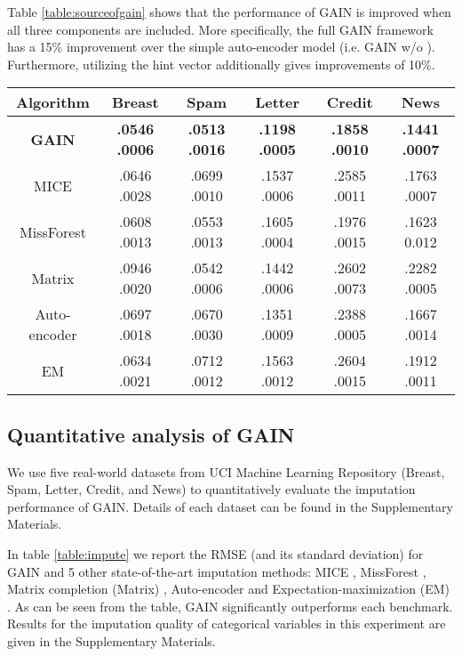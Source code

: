 \documentclass{article}
\begin{document}
Table \ref{table:sourceofgain} shows that the performance of GAIN is improved when all three components are included. More specifically, the full GAIN framework has a 15\% improvement over the simple auto-encoder model (i.e. GAIN w/o ). Furthermore, utilizing the hint vector additionally gives improvements of 10\%.


    \begin{table*}[t!]
        \renewcommand{\arraystretch}{1.3}
        \caption{Imputation performance in terms of RMSE (Average  Std of RMSE)}    
        \label{table:impute}
        \centering
        \begin{tabular}{ |c|| c | c  |  c| c | c |   }
            \toprule
            \textbf{Algorithm}    & \textbf{Breast} &  \textbf{Spam} & \textbf{Letter}& \textbf{Credit} & \textbf{News}   \\ \midrule
            \textbf{GAIN} & \textbf{.0546  .0006} & \textbf{.0513 .0016} & \textbf{.1198 .0005}  & \textbf{.1858  .0010} & \textbf{.1441  .0007}  \\  \midrule
            MICE  & .0646  .0028 & .0699  .0010 & .1537  .0006  & .2585  .0011 & .1763  .0007  \\ 
            MissForest  & .0608  .0013 & .0553  .0013 & .1605  .0004  & .1976  .0015 & .1623  0.012
             \\ 
            Matrix  & .0946  .0020 & .0542  .0006 & .1442  .0006  & .2602  .0073 & .2282  .0005 \\
            Auto-encoder  & .0697  .0018 & .0670  .0030 & .1351  .0009  & .2388  .0005 & .1667  .0014   \\
            EM & .0634  .0021 & .0712  .0012 & .1563  .0012  & .2604  .0015 & .1912  .0011   \\ \bottomrule
        \end{tabular}
    \end{table*}
    
\subsection{Quantitative analysis of GAIN}
We use five real-world datasets from UCI Machine Learning Repository
\cite{UCI} (Breast, Spam, Letter, Credit, and News) to quantitatively evaluate the imputation performance of GAIN. Details of each dataset can be found in the Supplementary Materials.

In table \ref{table:impute} we report the RMSE (and its standard deviation) for GAIN and 5 other state-of-the-art
imputation methods: MICE \cite{MICE,MICE-R}, MissForest \cite{missforest},
Matrix completion (Matrix) \cite{Mat-0}, Auto-encoder \cite{autoencoder}
and Expectation-maximization (EM) \cite{EM}. As can be seen from the table, GAIN significantly outperforms each benchmark. Results for the imputation quality of categorical variables in this experiment are given in the Supplementary Materials.
\end{document}
